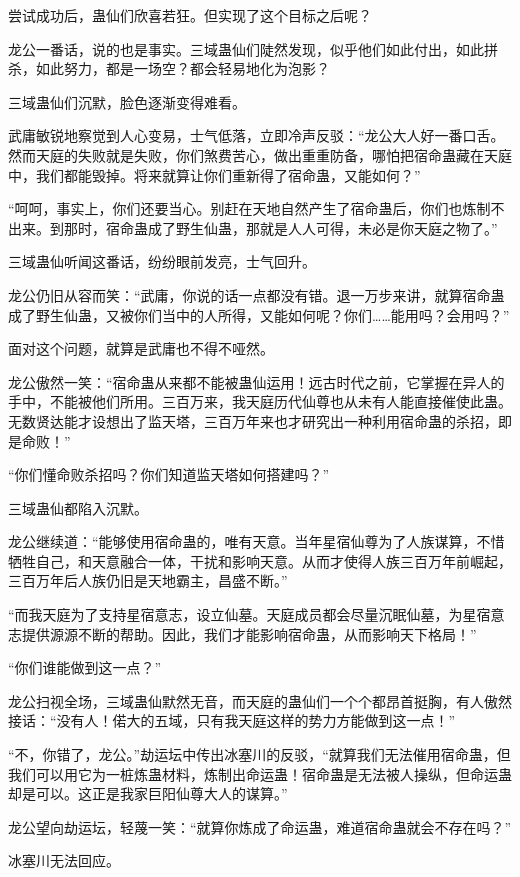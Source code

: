 \begin{this_body}
尝试成功后，蛊仙们欣喜若狂。但实现了这个目标之后呢？

龙公一番话，说的也是事实。三域蛊仙们陡然发现，似乎他们如此付出，如此拼杀，如此努力，都是一场空？都会轻易地化为泡影？

三域蛊仙们沉默，脸色逐渐变得难看。

武庸敏锐地察觉到人心变易，士气低落，立即冷声反驳：“龙公大人好一番口舌。然而天庭的失败就是失败，你们煞费苦心，做出重重防备，哪怕把宿命蛊藏在天庭中，我们都能毁掉。将来就算让你们重新得了宿命蛊，又能如何？”

“呵呵，事实上，你们还要当心。别赶在天地自然产生了宿命蛊后，你们也炼制不出来。到那时，宿命蛊成了野生仙蛊，那就是人人可得，未必是你天庭之物了。”

三域蛊仙听闻这番话，纷纷眼前发亮，士气回升。

龙公仍旧从容而笑：“武庸，你说的话一点都没有错。退一万步来讲，就算宿命蛊成了野生仙蛊，又被你们当中的人所得，又能如何呢？你们……能用吗？会用吗？”

面对这个问题，就算是武庸也不得不哑然。

龙公傲然一笑：“宿命蛊从来都不能被蛊仙运用！远古时代之前，它掌握在异人的手中，不能被他们所用。三百万来，我天庭历代仙尊也从未有人能直接催使此蛊。无数贤达能才设想出了监天塔，三百万年来也才研究出一种利用宿命蛊的杀招，即是命败！”

“你们懂命败杀招吗？你们知道监天塔如何搭建吗？”

三域蛊仙都陷入沉默。

龙公继续道：“能够使用宿命蛊的，唯有天意。当年星宿仙尊为了人族谋算，不惜牺牲自己，和天意融合一体，干扰和影响天意。从而才使得人族三百万年前崛起，三百万年后人族仍旧是天地霸主，昌盛不断。”

“而我天庭为了支持星宿意志，设立仙墓。天庭成员都会尽量沉眠仙墓，为星宿意志提供源源不断的帮助。因此，我们才能影响宿命蛊，从而影响天下格局！”

“你们谁能做到这一点？”

龙公扫视全场，三域蛊仙默然无音，而天庭的蛊仙们一个个都昂首挺胸，有人傲然接话：“没有人！偌大的五域，只有我天庭这样的势力方能做到这一点！”

“不，你错了，龙公。”劫运坛中传出冰塞川的反驳，“就算我们无法催用宿命蛊，但我们可以用它为一桩炼蛊材料，炼制出命运蛊！宿命蛊是无法被人操纵，但命运蛊却是可以。这正是我家巨阳仙尊大人的谋算。”

龙公望向劫运坛，轻蔑一笑：“就算你炼成了命运蛊，难道宿命蛊就会不存在吗？”

冰塞川无法回应。


\end{this_body}
